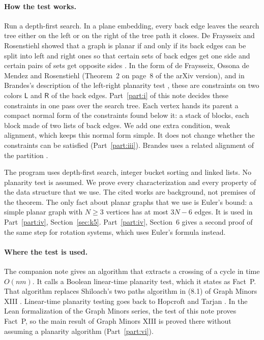 \documentclass[11pt]{article}
\newcommand{\cL}{\mathsf{L}}
\newcommand{\cR}{\mathsf{R}}
\begin{document}
\paragraph{How the test works.}
Run a depth-first search. In a plane embedding, every back edge leaves the
search tree either on the left or on the right of the tree path it closes.
De Fraysseix and Rosenstiehl showed that a graph is planar if and only if its
back edges can be split into left and right ones so that certain sets of back
edges get one side and certain pairs of sets get opposite sides
\cite{dFR82,dFR85}. In the form of de Fraysseix, Ossona de Mendez and
Rosenstiehl \cite{dFOMR06} (Theorem~2 on page~8 of the arXiv version), and in
Brandes's description of the left-right planarity test \cite[Theorem~5,
page~10]{Br09}, these are constraints on two colors $\cL$ and $\cR$ of the back
edges. Part~\ref{part:i} of this note decides these constraints in one pass
over the search tree. Each vertex hands its parent a compact normal form of
the constraints found below it: a stack of blocks, each block made of two
lists of back edges. We add one extra condition, weak alignment, which keeps
this normal form simple. It does not change whether the constraints can be
satisfied (Part~\ref{part:iii}). Brandes uses a related alignment of the
partition \cite[Lemma~6, page~11]{Br09}.

The program uses depth-first search, integer bucket sorting and linked lists.
No planarity test is assumed. We prove every characterization and every
property of the data structure that we use. The cited works are background,
not premises of the theorem. The only fact about planar graphs that we use is
Euler's bound: a simple planar graph with $N\ge3$ vertices has at most $3N-6$
edges. It is used in Part~\ref{part:iv}, Section~\ref{sec:k5}. Part~\ref{part:iv},
Section~6 gives a second proof of the same step for rotation systems, which
uses Euler's formula instead.

\paragraph{Where the test is used.}
The companion note \cite{HJ26} gives an algorithm that extracts a crossing of a
cycle in time $O(nm)$. It calls a Boolean linear-time planarity test, which it
states as Fact~P. That algorithm replaces Shiloach's two paths algorithm
\cite{Sh80} in (8.1) of Graph Minors XIII \cite[page~93]{GM13}. Linear-time
planarity testing goes back to Hopcroft and Tarjan \cite{HT74}. In the Lean
formalization of the Graph Minors series, the test of this note proves
Fact~P, so the main result of Graph Minors XIII is proved there without
assuming a planarity algorithm (Part~\ref{part:vi}).
\end{document}
